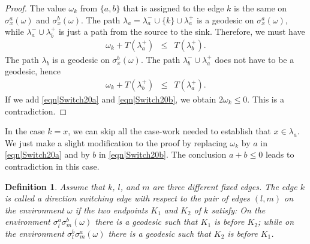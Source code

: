 \documentclass[reqno]{amsart}
\newtheorem{definition}[theorem]{Definition}
\begin{document}
\begin{proof}
The value $\omega_k$ from $\{a,b\}$ that is assigned to the edge $k$ is the same on $\sigma_x^a(\omega)$ and $\sigma_x^b(\omega)$.
The path $\lambda_a=\lambda_a^-\cup\{k\}\cup \lambda_a^+$ is a geodesic on $\sigma_x^a(\omega)$, while $\lambda_a^-\cup\lambda_b^+$ is just a path from the source to the sink. Therefore, we must have 
\begin{eqnarray}
\omega_k+T(\lambda_a^+)&\leq& T(\lambda_b^+). \label{eqn|Switch20a}
\end{eqnarray}
The path $\lambda_b$ is a geodesic on $\sigma_x^b(\omega)$. The path $\lambda_b^-\cup \lambda_a^+$ does not have to be a geodesic, hence 
\begin{eqnarray}
\omega_k+T(\lambda_b^+)&\leq& T(\lambda_a^+). \label{eqn|Switch20b}
\end{eqnarray}
If we add \eqref{eqn|Switch20a} and \eqref{eqn|Switch20b}, we obtain $2\omega_k\leq 0$. This is a contradiction. 
\end{proof}
 In the case $k=x$, we can skip all the case-work needed to establish that $x\in\lambda_a$. We just make a slight modification to the proof by replacing $\omega_k$ by $a$ in \eqref{eqn|Switch20a} and by $b$ in \eqref{eqn|Switch20b}. The conclusion $a+b\leq 0$ leads to contradiction in this case. 


\begin{definition}\label{def|DSwitch3} Assume that $k$, $l$, and $m$ are three different fixed edges. 
The edge $k$ is called a direction switching edge with respect to the pair of edges $(l,m)$ on the environment $\omega$ if the two endpoints $K_1$ and $K_2$ of $k$ satisfy:
On the environment $ \sigma_l^a\sigma_m^b(\omega)$ there is a geodesic such that $K_1$ is before $K_2$; while on the environment 
$ \sigma_l^b\sigma_m^a(\omega)$ there is a geodesic such that $K_2$ is before $K_1$. 
\end{definition}
\end{document}
